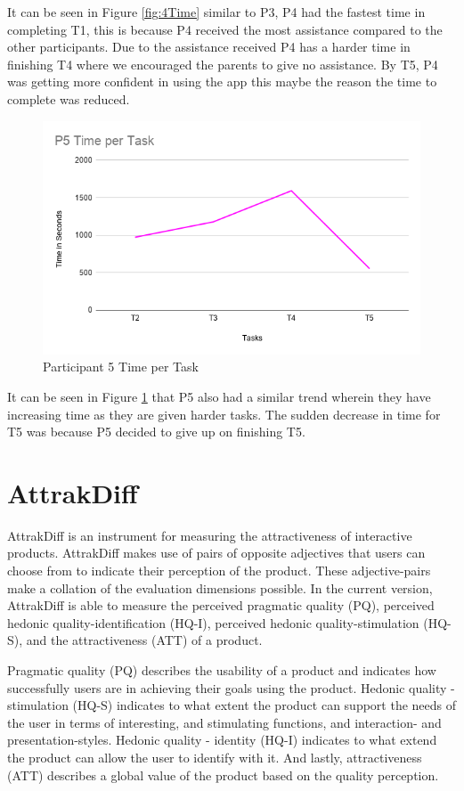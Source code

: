 It can be seen in Figure \ref{fig:4Time} similar to P3, P4 had the fastest time in completing T1, this is because P4 received the most assistance compared to the other participants. Due to the assistance received P4 has a harder time in finishing T4 where we encouraged the parents to give no assistance. By T5, P4 was getting more confident in using the app this maybe the reason the time to complete was reduced.

\begin{figure}[H]
    \centering
    \includegraphics[width=15cm]{figures/Results/P5Time.png}
    \caption{Participant 5 Time per Task}
    \label{fig:P5Time}
\end{figure}

It can be seen in Figure \ref{fig:P5Time} that P5 also had a similar trend wherein they have increasing time as they are given harder tasks. The sudden decrease in time for T5 was because P5 decided to give up on finishing T5.

\section{AttrakDiff}
AttrakDiff is an instrument for measuring the attractiveness of interactive products. AttrakDiff makes use of pairs of opposite adjectives that users can choose from to indicate their perception of the product. These adjective-pairs make a collation of the evaluation dimensions possible. In the current version, AttrakDiff is able to measure the perceived pragmatic quality (PQ), perceived hedonic quality-identification (HQ-I), perceived hedonic quality-stimulation (HQ-S), and the attractiveness (ATT) of a product.

Pragmatic quality (PQ) describes the usability of a product and indicates  how successfully users are in achieving their goals using the product. Hedonic quality - stimulation (HQ-S) indicates to what extent the product can support the needs of the user in terms of interesting, and stimulating functions, and interaction- and presentation-styles. Hedonic quality - identity (HQ-I) indicates to what extend the product can allow the user to identify with it. And lastly, attractiveness (ATT) describes a global value of the product based on the quality perception.

